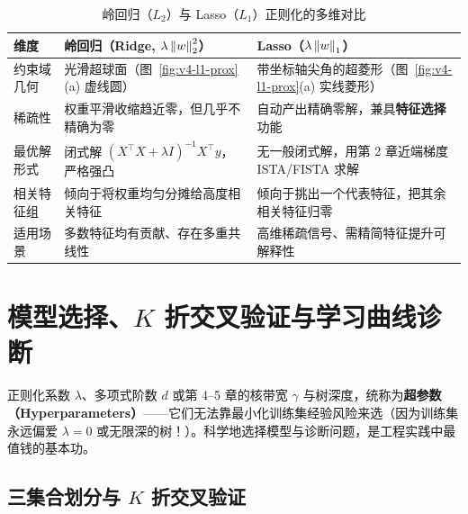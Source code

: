 \begin{table}[htbp]
\centering
\caption{岭回归（$L_2$）与 Lasso（$L_1$）正则化的多维对比}\label{tab:v4-ridge-lasso}
\small
\begin{tabularx}{\linewidth}{@{}lXX@{}}
\toprule
\textbf{维度} & \textbf{岭回归（Ridge, $\lambda\left\|w\right\|_2^2$）} & \textbf{Lasso（$\lambda\left\|w\right\|_1$）} \\
\midrule
约束域几何 & 光滑超球面（图~\ref{fig:v4-l1-prox}(a) 虚线圆） & 带坐标轴尖角的超菱形（图~\ref{fig:v4-l1-prox}(a) 实线菱形） \\
稀疏性 & 权重平滑收缩趋近零，但几乎不精确为零 & 自动产出精确零解，兼具\textbf{特征选择}功能 \\
最优解形式 & 闭式解 $(X^\top X + \lambda I)^{-1}X^\top y$，严格强凸 & 无一般闭式解，用第 2 章近端梯度 ISTA/FISTA 求解 \\
相关特征组 & 倾向于将权重均匀分摊给高度相关特征 & 倾向于挑出一个代表特征，把其余相关特征归零 \\
适用场景 & 多数特征均有贡献、存在多重共线性 & 高维稀疏信号、需精简特征提升可解释性 \\
\bottomrule
\end{tabularx}
\end{table}

\section{模型选择、$K$ 折交叉验证与学习曲线诊断}

正则化系数 $\lambda$、多项式阶数 $d$ 或第 4--5 章的核带宽 $\gamma$ 与树深度，统称为\textbf{超参数（Hyperparameters）}——它们无法靠最小化训练集经验风险来选（因为训练集永远偏爱 $\lambda = 0$ 或无限深的树！）。科学地选择模型与诊断问题，是工程实践中最值钱的基本功。

\subsection{三集合划分与 $K$ 折交叉验证}

